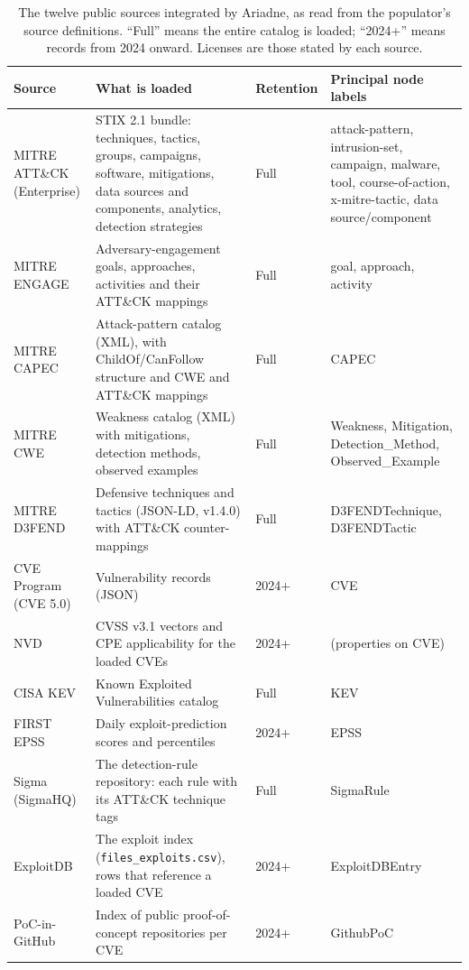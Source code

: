 \documentclass[a4paper,fleqn]{cas-dc}
\begin{document}
\begin{table}
\centering\footnotesize
\caption{The twelve public sources integrated by Ariadne, as read from the populator's source definitions. ``Full'' means the entire catalog is loaded; ``2024+'' means records from 2024 onward. Licenses are those stated by each source.}\label{tab:sources}
\begin{tabularx}{\textwidth}{@{}P{2.9cm}XP{1.45cm}P{3.6cm}@{}}
\toprule Source & What is loaded & Retention & Principal node labels \\\midrule
MITRE ATT\&CK (Enterprise) & STIX 2.1 bundle: techniques, tactics, groups, campaigns, software, mitigations, data sources and components, analytics, detection strategies & Full & attack-pattern, intrusion-set, campaign, malware, tool, course-of-action, x-mitre-tactic, data source/component \\
MITRE ENGAGE & Adversary-engagement goals, approaches, activities and their ATT\&CK mappings & Full & goal, approach, activity \\
MITRE CAPEC & Attack-pattern catalog (XML), with ChildOf/CanFollow structure and CWE and ATT\&CK mappings & Full & CAPEC \\
MITRE CWE & Weakness catalog (XML) with mitigations, detection methods, observed examples & Full & Weakness, Mitigation, Detection\_Method, Observed\_Example \\
MITRE D3FEND & Defensive techniques and tactics (JSON-LD, v1.4.0) with ATT\&CK counter-mappings & Full & D3FENDTechnique, D3FENDTactic \\
CVE Program (CVE 5.0) & Vulnerability records (JSON) & 2024+ & CVE \\
NVD & CVSS v3.1 vectors and CPE applicability for the loaded CVEs & 2024+ & (properties on CVE) \\
CISA KEV & Known Exploited Vulnerabilities catalog & Full & KEV \\
FIRST EPSS & Daily exploit-prediction scores and percentiles & 2024+ & EPSS \\
Sigma (SigmaHQ) & The detection-rule repository: each rule with its ATT\&CK technique tags & Full & SigmaRule \\
ExploitDB & The exploit index (\texttt{files\_exploits.csv}), rows that reference a loaded CVE & 2024+ & ExploitDBEntry \\
PoC-in-GitHub & Index of public proof-of-concept repositories per CVE & 2024+ & GithubPoC \\
\bottomrule
\end{tabularx}
\end{table}
\end{document}
